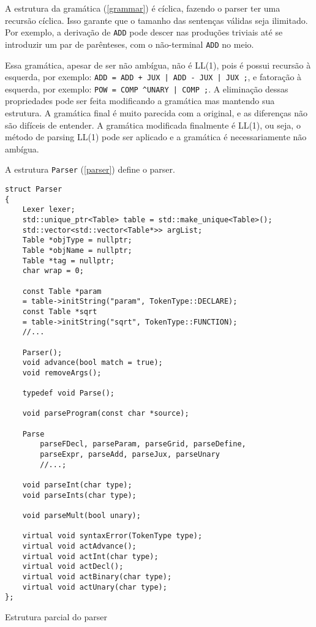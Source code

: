 \documentclass[10pt,a4paper]{article}
\newenvironment{code}{\captionsetup{type=listing}}{}
\begin{document}
A estrutura da gramática (\ref{grammar}) é cíclica, fazendo o parser ter uma recursão cíclica.
Isso garante que o tamanho das sentenças válidas seja ilimitado.
Por exemplo, a derivação de \texttt{ADD} pode descer nas produções triviais até
se introduzir um par de parênteses, com o não-terminal \texttt{ADD} no meio.

Essa gramática, apesar de ser não ambígua, não é LL(1), pois é possui recursão à esquerda,
por exemplo: \texttt{ADD = ADD + JUX | ADD - JUX | JUX ;}, e fatoração à esquerda,
por exemplo: \texttt{POW = COMP \textasciicircum UNARY | COMP ;}.
A eliminação dessas propriedades pode ser feita modificando a gramática mas mantendo sua estrutura.
A gramática final é muito parecida com a original, e as diferenças não são difíceis de entender.
A gramática modificada finalmente é LL(1), ou seja, o método de parsing LL(1) pode ser aplicado e
a gramática é necessariamente não ambígua.

A estrutura \texttt{Parser} (\ref{parser}) define o parser.

\newpage
\begin{code}
\begin{verbatim}
struct Parser
{
    Lexer lexer;
    std::unique_ptr<Table> table = std::make_unique<Table>();
    std::vector<std::vector<Table*>> argList;
    Table *objType = nullptr;
    Table *objName = nullptr;
    Table *tag = nullptr;
    char wrap = 0;
	
    const Table *param
    = table->initString("param", TokenType::DECLARE);
    const Table *sqrt
    = table->initString("sqrt", TokenType::FUNCTION);
    //...

    Parser();
    void advance(bool match = true);
    void removeArgs();

    typedef void Parse();

    void parseProgram(const char *source);

    Parse 
        parseFDecl, parseParam, parseGrid, parseDefine, 
        parseExpr, parseAdd, parseJux, parseUnary
        //...;

    void parseInt(char type);
    void parseInts(char type);

    void parseMult(bool unary);

    virtual void syntaxError(TokenType type);
    virtual void actAdvance();
    virtual void actInt(char type);
    virtual void actDecl();
    virtual void actBinary(char type);
    virtual void actUnary(char type);
};
\end{verbatim}
\caption{Estrutura parcial do parser}
\label{parser}
\end{code}
\end{document}
